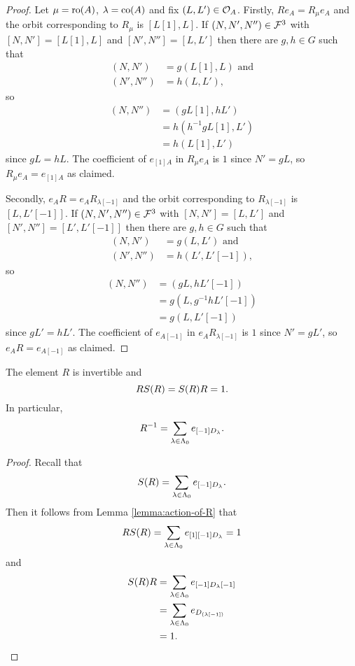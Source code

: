 \documentclass[a4paper, 11pt, twoside]{report}
\begin{document}
\begin{proof}
Let $\mu = \operatorname{ro}(A)$, $\lambda=\operatorname{co}(A)$ and fix $(L,L')\in\mathcal{O}_{A}$. Firstly, $Re_A=R_\mu e_A$ and the orbit corresponding to $R_\mu$ is $[L[1],L]$. If $(N,N',N'')\in\mathcal{F}^3$ with $[N,N']=[L[1],L]$ and $[N',N'']=[L,L']$ then there are $g,h\in G$ such that
\begin{align*}
(N,N') &= g(L[1],L) \text{ and}\\
(N',N'') &= h(L,L'),
\end{align*}
so
\begin{align*}
(N,N'')
&= (gL[1],h L')\\
&= h(h^{-1}gL[1],L')\\
&= h(L[1],L')
\end{align*}
since $gL=hL$. The coefficient of $e_{[1]A}$ in $R_\mu e_A$ is $1$ since $N'=gL$, so $R_\mu e_A = e_{[1]A}$ as claimed.

Secondly, $e_AR = e_A R_{\lambda[-1]}$ and the orbit corresponding to $R_{\lambda[-1]}$ is $[L,L'[-1]]$. If $(N,N',N'')\in\mathcal{F}^3$ with $[N,N']=[L,L']$ and $[N',N''] = [L',L'[-1]]$ then there are $g,h\in G$ such that
\begin{align*}
(N,N') &= g(L,L') \text{ and}\\
(N',N'') &= h(L',L'[-1]),
\end{align*}
so
\begin{align*}
(N,N'')
&= (gL,hL'[-1])\\
&= g(L,g^{-1}hL'[-1])\\
&= g(L,L'[-1])
\end{align*}
since $gL'=hL'$. The coefficient of $e_{A[-1]}$ in $e_AR_{\lambda[-1]}$ is $1$ since $N'=gL'$, so $e_A R=e_{A[-1]}$ as claimed.
\end{proof}

\begin{lemma}\label{lemma:R-is-a-unit}
The element $R$ is invertible and
\begin{equation*}
R S{(R)} = S{(R)} R = 1.
\end{equation*}
In particular,
\begin{equation*}
R^{-1} = \sum_{\lambda\in\Lambda_0{}} e_{[-1]D_{\lambda}}.
\end{equation*}
\end{lemma}

\begin{proof}
Recall that
\begin{equation*}
S{(R)} = \sum_{\lambda\in\Lambda_0{}} e_{[-1]D_{\lambda}}.
\end{equation*}
Then it follows from Lemma \ref{lemma:action-of-R} that
\begin{equation*}
RS{(R)} = \sum_{\lambda\in\Lambda_0{}}e_{[1][-1]D_{\lambda}} = 1
\end{equation*}
and
\begin{align*}
S{(R)} R
&= \sum_{\lambda\in\Lambda_0{}} e_{[-1]D_{\lambda}[-1]}\\
&= \sum_{\lambda\in\Lambda_0{}} e_{D_{(\lambda[-1])}}\\
&= 1.
\end{align*}
\end{proof}
\end{document}
